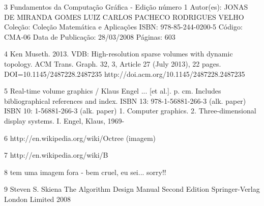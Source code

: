 3 	Fundamentos da Computação Gráfica - Edição número 1	
Autor(es):
JONAS DE MIRANDA GOMES
LUIZ CARLOS PACHECO RODRIGUES VELHO
Coleção: Coleção Matemática e Aplicações
ISBN: 978-85-244-0200-5
Código: CMA-06
Data de Publicação: 28/03/2008
Páginas: 603

4 Ken Museth. 2013. VDB: High-resolution sparse volumes with dynamic topology. ACM Trans. Graph. 32, 3, Article 27 (July 2013), 22 pages. DOI=10.1145/2487228.2487235 http://doi.acm.org/10.1145/2487228.2487235

5 Real-time volume graphics / Klaus Engel ... [et al.]. p. cm.
Includes bibliographical references and index. ISBN 13: 978-1-56881-266-3 (alk. paper) ISBN 10: 1-56881-266-3 (alk. paper)
1. Computer graphics. 2. Three-dimensional display systems. I. Engel, Klaus, 1969-

6 http://en.wikipedia.org/wiki/Octree (imagem)

7 http://en.wikipedia.org/wiki/B%

8 tem uma imagem fora - bem cruel, eu sei... sorry!!

9
Steven S. Skiena
The Algorithm Design Manual Second Edition
Springer-Verlag London Limited 2008

\fi